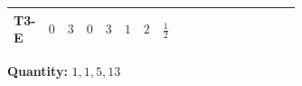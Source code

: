 \documentclass[8pt]{article}
\begin{document}
\begin{landscape}
\begin{longtable}{@{}llcccccc >{\raggedright\arraybackslash}p{0.21\linewidth} >{\raggedright\arraybackslash}p{0.21\linewidth} >{\raggedright\arraybackslash}p{0.21\linewidth}@{}}
\midrule
T3-E & $0$ & $3$ & $0$ & $3$ & $1$ & $2$ & $\frac{1}{2}$ & \scriptsize\adjustbox{max width=\linewidth}{$\begin{gathered} - \frac{11 \sqrt{3} g_{2}^{2} \overline{y_{1}} \overline{y_{2}}}{8 MF}\end{gathered}$} & \scriptsize\adjustbox{max width=\linewidth}{$\begin{gathered} - \frac{3 \sqrt{11} lambda12Inv2 \overline{y_{1}} \overline{y_{2}}}{22 MF}\end{gathered}$} & \scriptsize\adjustbox{max width=\linewidth}{$\begin{gathered} - \frac{\sqrt{3} g_{1}^{2} \overline{y_{1}} \overline{y_{2}}}{8 MF}\end{gathered}$} \\
\midrule
\bottomrule
\end{longtable}
\clearpage
\noindent\textbf{Quantity: }$\mathrm{1,1,5,13}$\par\smallskip

\end{landscape}
\end{document}

